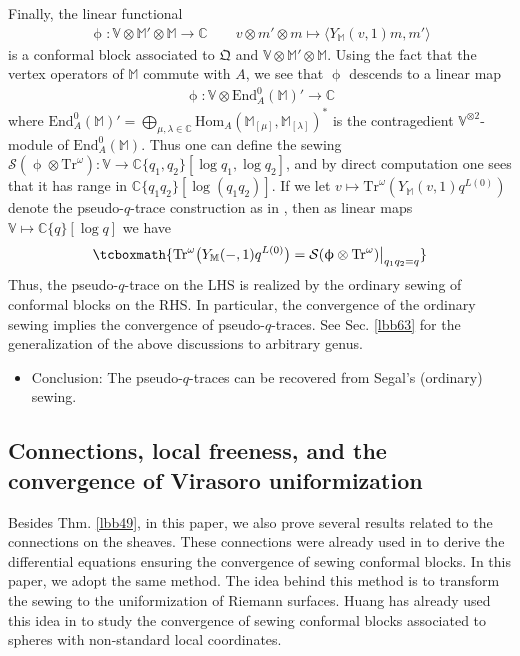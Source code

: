 \documentclass[11pt,b5paper,notitlepage]{article}
\theoremstyle{definition}
\theoremstyle{plain}
\newcommand{\Tr}{\mathrm{Tr}}
\newcommand{\End}{\mathrm{End}} %
\newcommand{\Hom}{\mathrm{Hom}}
\newcommand{\blt}{\bullet}
\newcommand{\Vbb}{\mathbb V}
\newcommand{\Mbb}{\mathbb M}
\newcommand{\Cbb}{\mathbb C}
\newcommand{\<}{\left\langle}
\renewcommand{\>}{\right\rangle}
\newcommand{\fx}{\mathfrak{X}}
\newcommand{\MD}{\mathcal{D}}
\newcommand{\MS}{\mathcal{S}}
\newcommand{\bk}[1]{\langle {#1}\rangle}
\newcommand{\fq}{{\mathfrak Q}}
\numberwithin{equation}{section}
\begin{document}
Finally, the linear functional
\begin{align*}
\upphi:\Vbb\otimes \Mbb'\otimes\Mbb\rightarrow\Cbb\qquad v\otimes m'\otimes m\mapsto\bk{Y_\Mbb(v,1)m,m'}
\end{align*}
is a conformal block associated to $\fq$ and $\Vbb\otimes\Mbb'\otimes\Mbb$. Using the fact that the vertex operators of $\Mbb$ commute with $A$, we see that $\upphi$ descends to a linear map
\begin{align*}
\upphi:\Vbb\otimes\End^0_A(\Mbb)'\rightarrow\Cbb
\end{align*}
where $\End^0_A(\Mbb)'=\bigoplus_{\mu,\lambda\in\Cbb}\Hom_A(\Mbb_{[\mu]},\Mbb_{[\lambda]})^*$ is the contragedient $\Vbb^{\otimes2}$-module of $\End^0_A(\Mbb)$. %
Thus one can define the sewing $\MS(\upphi\otimes\Tr^\omega):\Vbb\rightarrow\Cbb\{q_1,q_2\}[\log q_1,\log q_2]$, and by direct computation one sees that it has range in $\Cbb\{q_1q_2\}[\log(q_1q_2)]$. If we let $v\mapsto\Tr^\omega(Y_\Mbb(v,1)q^{L(0)})$ denote the pseudo-$q$-trace construction as in \cite{Miy-modular-invariance,AN-pseudo-trace,Fio-genus-1,Hua-modular-C2}, then as linear maps $\Vbb\mapsto\Cbb\{q\}[\log q]$ we have
\begin{align}
\tcboxmath{\Tr^\omega \big(Y_\Mbb(-,1)q^{L(0)}\big)=\MS(\upphi\otimes\Tr^\omega)\big|_{q_1q_2=q}}
\end{align}
Thus, the pseudo-$q$-trace on the LHS is realized by the ordinary sewing of conformal blocks on the RHS. In particular, the convergence of the ordinary sewing implies the convergence of pseudo-$q$-traces. See Sec. \ref{lbb63} for the generalization of the above discussions to arbitrary genus.

\begin{itemize}
\item Conclusion: The pseudo-$q$-traces can be recovered from Segal's (ordinary) sewing.
\end{itemize}




\subsection{Connections, local freeness, and the convergence of Virasoro uniformization}


Besides Thm. \ref{lbb49}, in this paper, we also prove several results related to the connections on the sheaves. These connections were already used in \cite{Gui-sewingconvergence} to derive the differential equations ensuring the convergence of sewing conformal blocks. In this paper, we adopt the same method. The idea behind this method is to transform the sewing to the uniformization of Riemann surfaces. Huang has already used this idea in \cite{Hua97} to study the convergence of sewing conformal blocks associated to spheres with non-standard local coordinates. 
\end{document}
